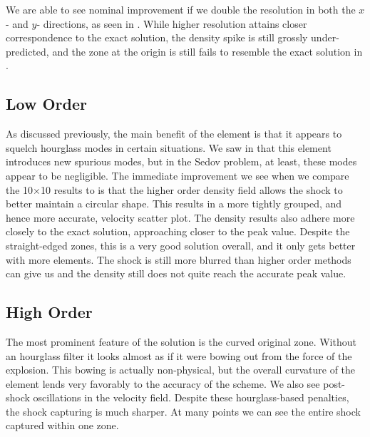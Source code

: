 We are able to see nominal improvement if we double the resolution in both the $x$- and $y$- directions, as seen in . While higher resolution attains closer correspondence to the exact solution, the density spike is still grossly under-predicted, and the zone at the origin is still fails to resemble the exact solution in .


\subsection{Low Order \texorpdfstring{}{Q1-Q1}}
As discussed previously, the main benefit of the  element is that it appears to squelch hourglass modes in certain situations. We saw in  that this element introduces new spurious modes, but in the Sedov problem, at least, these modes appear to be negligible. The immediate improvement we see when we compare the 10$\times$10 results to  is that the higher order density field allows the shock to better maintain a circular shape. This results in a more tightly grouped, and hence more accurate, velocity scatter plot. The density results also adhere more closely to the exact solution, approaching closer to the peak value. Despite the straight-edged zones, this is a very good solution overall, and it only gets better with more elements. The shock is still more blurred than higher order methods can give us and the density still does not quite reach the accurate peak value.


\subsection{High Order \texorpdfstring{}{Q2-Q1}}
The most prominent feature of the  solution is the curved original zone. Without an hourglass filter it looks almost as if it were bowing out from the force of the explosion. This bowing is actually non-physical, but the overall curvature of the element lends very favorably to the accuracy of the scheme. We also see post-shock oscillations in the velocity field. Despite these hourglass-based penalties, the shock capturing is much sharper. At many points we can see the entire shock captured within one zone. 

